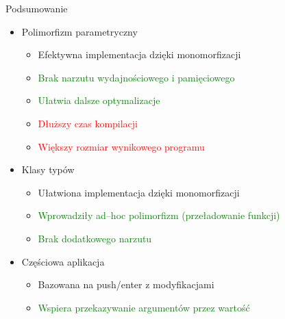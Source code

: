 \documentclass{beamer}
\begin{document}
\begin{frame}{Podsumowanie}
  \begin{itemize}
  \item
    Polimorfizm parametryczny
    \begin{itemize}
        \item Efektywna implementacja dzięki monomorfizacji 
        \item \textcolor{green}{Brak narzutu wydajnościowego i pamięciowego}
        \item \textcolor{green}{Ułatwia dalsze optymalizacje}
        \item \textcolor{red}{Dłuższy czas kompilacji}
        \item \textcolor{red}{Większy rozmiar wynikowego programu}
    \end{itemize}
  \item Klasy typów 
  \begin{itemize}
      \item Ułatwiona implementacja dzięki monomorfizacji 
      \item \textcolor{green}{Wprowadziły ad--hoc polimorfizm 
      (przeładowanie funkcji)}
      \item \textcolor{green}{Brak dodatkowego narzutu}
  \end{itemize}
  \item Częściowa aplikacja
  \begin{itemize}
      \item Bazowana na push/enter z modyfikacjami
      \item \textcolor{green}{Wspiera przekazywanie argumentów przez wartość}
  \end{itemize}
  \end{itemize}
\end{frame}
\end{document}
